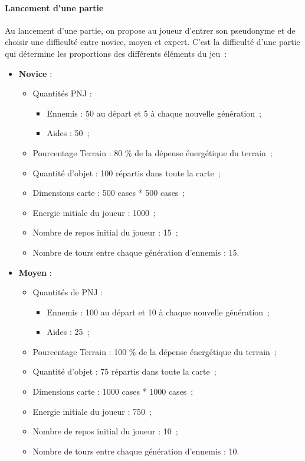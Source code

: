 \documentclass[11pt]{article}
\begin{document}
\paragraph{Lancement d'une partie}

Au lancement d'une partie, on propose au joueur d'entrer son pseudonyme et de choisir une difficulté entre novice, moyen et expert. C'est la difficulté d'une partie qui détermine les proportions des différents éléments du jeu~:

\begin{itemize}
 \item \textbf{Novice} :

	\begin{itemize}
		\item Quantités PNJ :
		
		\begin{itemize}
			\item Ennemis : 50 au départ et 5 à chaque nouvelle génération~;
			\item Aides : 50~;
		\end{itemize}

		\item Pourcentage Terrain : 80 \% de la dépense énergétique du terrain~;
		\item Quantité d'objet : 100 répartis dans toute la carte~;
		\item Dimensions carte : 500 cases * 500 cases~;
		\item Energie initiale du joueur : 1000~;
		\item Nombre de repos initial du joueur : 15~;
		\item Nombre de tours entre chaque génération d'ennemis : 15.

	\end{itemize}

 \item \textbf{Moyen} :

		\begin{itemize}
			\item Quantités de PNJ :
			
			\begin{itemize}
				\item Ennemis : 100 au départ et 10 à chaque nouvelle génération~;
				\item Aides : 25~;
			\end{itemize}

			\item Pourcentage Terrain : 100 \% de la dépense énergétique du terrain~;
			\item Quantité d'objet : 75 répartis dans toute la carte~;
			\item Dimensions carte : 1000 cases * 1000 cases~;
			\item Energie initiale du joueur : 750~;
			\item Nombre de repos initial du joueur : 10~;
			\item Nombre de tours entre chaque génération d'ennemis : 10.


\end{itemize}
\end{itemize}
\end{document}
